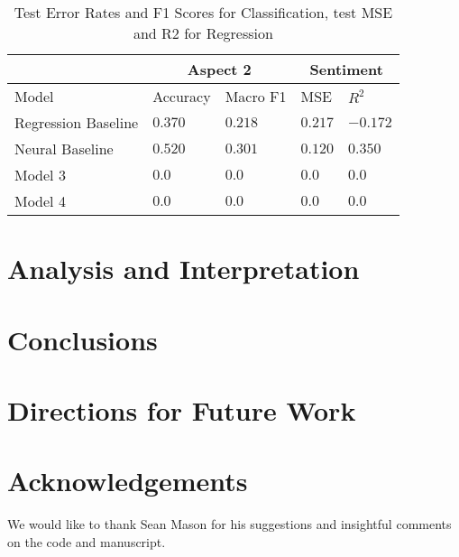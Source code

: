 \documentclass[11pt,a4paper,titlepage]{article}
\begin{document}
\begin{table*}
  \small
  \caption{Test Error Rates and F1 Scores for Classification, test MSE and R2 for Regression}
  \label{results-table}
  \centering
  \begin{tabular}{lllll}
    \multicolumn{1}{c}{} & \multicolumn{2}{c}{Aspect 2} & \multicolumn{2}{c}{Sentiment}\\
    \hline
    Model                   & Accuracy         & Macro F1         & MSE              & $R^2$ \\ 
    \midrule
    Regression Baseline     & $0.370$          & $0.218$          & $0.217$          & $-0.172$          \\
    Neural Baseline         & $\mathbf{0.520}$ & $\mathbf{0.301}$ & $\mathbf{0.120}$ & $\mathbf{0.350}$  \\
    Model 3                 & $0.0$            & $0.0$            & $0.0$            & $0.0$             \\
    Model 4                 & $0.0$            & $0.0$            & $0.0$            & $0.0$             \\
    \bottomrule
  \end{tabular}
\end{table*}



\section{Analysis and Interpretation}


\section{Conclusions}


\section{Directions for Future Work}


\section{Acknowledgements}

We would like to thank Sean Mason for his suggestions and insightful comments on the code and manuscript.



\end{document}
